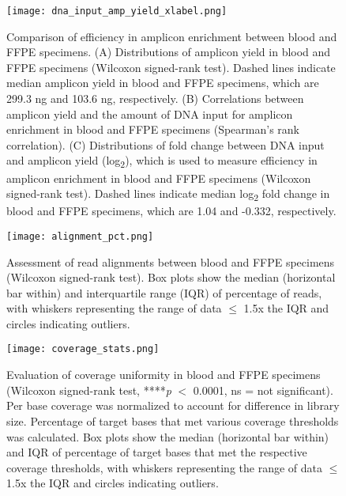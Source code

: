 \begin{figure}[H]
	\centering
	\texttt{[image: dna\_input\_amp\_yield\_xlabel.png]}
	\caption[Comparison of efficiency in amplicon enrichment between blood and FFPE specimens.]{Comparison of efficiency in amplicon enrichment between blood and FFPE specimens. (A) Distributions of amplicon yield in blood and FFPE specimens (Wilcoxon signed-rank test). Dashed lines indicate median amplicon yield in blood and FFPE specimens, which are 299.3 ng and 103.6 ng, respectively. (B) Correlations between amplicon yield and the amount of DNA input for amplicon enrichment in blood and FFPE specimens (Spearman's rank correlation). (C) Distributions of fold change between DNA input and amplicon yield (log\textsubscript{2}), which is used to measure efficiency in amplicon enrichment in blood and FFPE specimens (Wilcoxon signed-rank test). Dashed lines indicate median log\textsubscript{2} fold change in blood and FFPE specimens, which are 1.04 and -0.332, respectively.}
	\label{fig:dna_input_amp_yield}
\end{figure}


\begin{figure}[H]
	\centering
	\texttt{[image: alignment\_pct.png]}
	\caption[Assessment of read alignments between blood and FFPE specimens (Wilcoxon signed-rank test).]{Assessment of read alignments between blood and FFPE specimens (Wilcoxon signed-rank test). Box plots show the median (horizontal bar within) and interquartile range (IQR) of percentage of reads, with whiskers representing the range of data $\leq$ 1.5x the IQR and circles indicating outliers.}
	\label{fig:alignment_pct}
\end{figure}


\begin{figure}[H]
	\centering
	\texttt{[image: coverage\_stats.png]}
	\caption[Evaluation of coverage uniformity in blood and FFPE specimens (Wilcoxon signed-rank test, ****\textit{p} $<$ 0.0001, ns = not significant).]{Evaluation of coverage uniformity in blood and FFPE specimens (Wilcoxon signed-rank test, ****\textit{p} $<$ 0.0001, ns = not significant). Per base coverage was normalized to account for difference in library size. Percentage of target bases that met various coverage thresholds was calculated. Box plots show the median (horizontal bar within) and IQR of percentage of target bases that met the respective coverage thresholds, with whiskers representing the range of data $\leq$ 1.5x the IQR and circles indicating outliers.}
	\label{fig:coverage_stats}
\end{figure}

